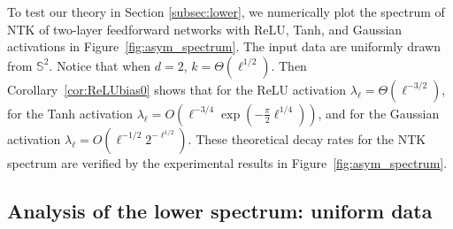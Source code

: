 To test our theory in Section \ref{subsec:lower}, we numerically plot the spectrum of NTK of two-layer feedforward networks with ReLU, Tanh, and Gaussian activations in Figure~\ref{fig:asym_spectrum}. The input data are uniformly drawn from $\mathbb{S}^2$. Notice that when $d=2$, $k=\Theta(\ell^{1/2})$. Then Corollary~\ref{cor:ReLUbias0} shows that for the ReLU activation $\lambda_\ell=\Theta(\ell^{-3/2})$, for the Tanh activation $\lambda_\ell=O\left(\ell^{-3/4}\exp(-\frac{\pi}{2}\ell^{1/4})\right)$, and for the Gaussian activation $\lambda_\ell=O(\ell^{-1/2}2^{-\ell^{1/2}})$. These theoretical decay rates for the NTK spectrum are verified by the experimental results in Figure~\ref{fig:asym_spectrum}.



\subsection{Analysis of the lower spectrum: uniform data}\label{appendix:lower_uniform}

\unifEigDecay* 

